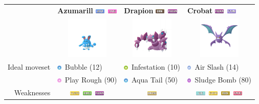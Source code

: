 \documentclass[12pt]{beamer}
\newcommand{\darkfull}{\includegraphics[height=0.2cm]{../../images/type/full/Dark.png}}
\newcommand{\electricfull}{\includegraphics[height=0.2cm]{../../images/type/full/Electric.png}}
\newcommand{\fairyfull}{\includegraphics[height=0.2cm]{../../images/type/full/Fairy.png}}
\newcommand{\flyingfull}{\includegraphics[height=0.2cm]{../../images/type/full/Flying.png}}
\newcommand{\grassfull}{\includegraphics[height=0.2cm]{../../images/type/full/Grass.png}}
\newcommand{\groundfull}{\includegraphics[height=0.2cm]{../../images/type/full/Ground.png}}
\newcommand{\icefull}{\includegraphics[height=0.2cm]{../../images/type/full/Ice.png}}
\newcommand{\psychicfull}{\includegraphics[height=0.2cm]{../../images/type/full/Psychic.png}}
\newcommand{\rockfull}{\includegraphics[height=0.2cm]{../../images/type/full/Rock.png}}
\newcommand{\waterfull}{\includegraphics[height=0.2cm]{../../images/type/full/Water.png}}
\newcommand{\poisonfull}{\includegraphics[height=0.2cm]{../../images/type/full/Poison.png}}
\newcommand{\watersimp}{\includegraphics[height=0.2cm]{../../images/type/simplified/water.png}}
\newcommand{\fairysimp}{\includegraphics[height=0.2cm]{../../images/type/simplified/fairy.png}}
\newcommand{\flyingsimp}{\includegraphics[height=0.2cm]{../../images/type/simplified/flying.png}}
\newcommand{\poisonsimp}{\includegraphics[height=0.2cm]{../../images/type/simplified/poison.png}}
\newcommand{\bugsimp}{\includegraphics[height=0.2cm]{../../images/type/simplified/bug.png}}
\begin{document}
\begin{frame}
\begin{block}{}
\begin{footnotesize}
\begin{center}
\begin{tabular}{rp{3.2cm}p{3.2cm}p{3.2cm}}
& \textbf{Azumarill} \hfill\waterfull~\fairyfull & \textbf{Drapion} \hfill \darkfull~\poisonfull & \textbf{Crobat} \hfill \poisonfull~\flyingfull  \\
& \multicolumn{1}{c}{\includegraphics[width=2cm]{../../images/pokemon/Azumarill}} &
\multicolumn{1}{c}{\includegraphics[width=2cm]{../../images/pokemon/Drapion}} &
\multicolumn{1}{c}{\includegraphics[width=2cm]{../../images/pokemon/Crobat}}  \\ \hline
Ideal moveset &  \watersimp~Bubble (12)& \bugsimp~Infestation (10) & \flyingsimp~Air Slash (14)  \\
&  \fairysimp~Play Rough (90) &  \watersimp~Aqua Tail (50) & \poisonsimp~Sludge Bomb (80)  \\ \hline
Weaknesses  & \multicolumn{1}{c}{\electricfull~\grassfull~\poisonfull}  &  \multicolumn{1}{c}{\groundfull} & \multicolumn{1}{c}{\icefull~\electricfull~\rockfull~\psychicfull} \\
\end{tabular}
\end{center}



\end{footnotesize}
\end{block}
\end{frame}
\end{document}
